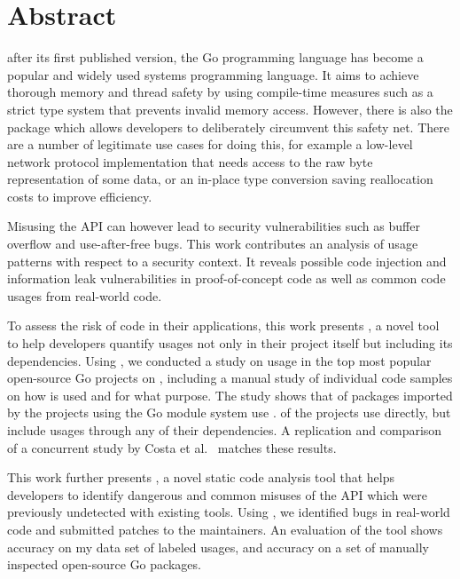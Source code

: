 \chapter*{Abstract}

 after its first published version, the Go programming language has become a popular and
widely used systems programming language.
It aims to achieve thorough memory and thread safety by using compile-time measures such as a strict type system that
prevents invalid memory access.
However, there is also the \unsafe{} package which allows developers to deliberately circumvent this safety net.
There are a number of legitimate use cases for doing this, for example a low-level network protocol implementation that
needs access to the raw byte representation of some data, or an in-place type conversion saving reallocation costs to
improve efficiency.

Misusing the \unsafe{} API can however lead to security vulnerabilities such as buffer overflow and use-after-free bugs.
This work contributes an analysis of \unsafe{} usage patterns with respect to a security context.
It reveals possible code injection and information leak vulnerabilities in proof-of-concept code as well as common code
usages from real-world code.

To assess the risk of \unsafe{} code in their applications, this work presents \toolGeiger{}, a novel tool to help
developers quantify \unsafe{} usages not only in their project itself but including its dependencies.
Using \toolGeiger{}, we conducted a study on \unsafe{} usage in the top \projsTotal{} most popular open-source Go
projects on \github{}, including a manual study of \numberLabeledCodeSnippets{} individual code samples on how \unsafe{}
is used and for what purpose.
The study shows that \percentageUnsafePackages{} of packages imported by the projects using the Go module system use
\unsafe{}.
\percentageUnsafeProjects{} of the projects use \unsafe{} directly, but \percentageUnsafeTransitiveWithDependencies{}
include \unsafe{} usages through any of their dependencies.
A replication and comparison of a concurrent study by Costa et al.~\cite{costa2020} matches these results.

This work further presents \toolSafer{}, a novel static code analysis tool that helps developers to identify
 dangerous and common misuses of the \unsafe{} API which were previously undetected with existing tools.
Using \toolSafer{}, we identified \numberBugsFixed{} bugs in real-world code and submitted patches to the maintainers.
An evaluation of the tool shows \goSaferEvaluationDatasetGosaferAccuracy{} accuracy on my data set of labeled \unsafe{}
usages, and \goSaferEvaluationPackagesGosaferAccuracy{} accuracy on a set of manually inspected open-source Go packages.


